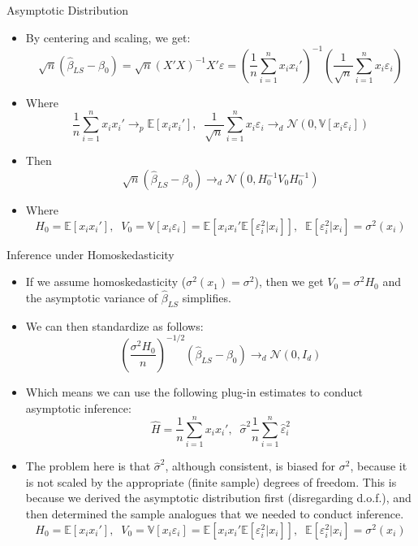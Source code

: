 \documentclass[fleqn, 10pt]{beamer}
\newcommand{\E}{\mathbb{E}}
\newcommand{\V}{\mathbb{V}}
\begin{document}
\begin{frame}{Asymptotic Distribution}
	
	\begin{itemize}
		\item By centering and scaling, we get:
		\[ \sqrt{n} \left( \hat{\beta}_{LS} - \beta_0 \right) = \sqrt{n} (X'X)^{-1}X'\varepsilon =  \left( \frac{1}{n} \sum_{i=1}^{n} x_i x_i' \right)^{-1} \left( \frac{1}{\sqrt{n}} \sum_{i=1}^{n} x_i \varepsilon_i \right) \]
		\item Where
		\[ \frac{1}{n} \sum_{i=1}^{n} x_i x_i' \to_p \E[x_i x_i'], \;\; \frac{1}{\sqrt{n}} \sum_{i=1}^{n} x_i \varepsilon_i \to_d \mathcal{N} (0, \V[x_i\varepsilon_i]) \]
		\item Then
		\[ \sqrt{n} \left( \hat{\beta}_{LS} - \beta_0 \right) \to_d \mathcal{N} (0, H_0^{-1} V_0 H_0^{-1}) \]
		\item Where
		\[ H_0 = \E[x_i x_i'], \;\; V_0 = \V[x_i \varepsilon_i] = \E[x_i x_i' \E[\varepsilon_i^2|x_i]], \;\; \E[\varepsilon_i^2|x_i] = \sigma^2(x_i) \]
	\end{itemize}
	
\end{frame}

\begin{frame}{Inference under Homoskedasticity}
	
	\begin{itemize}
		\item If we assume homoskedasticity (\( \sigma^2(x_1) = \sigma^2 \)), then we get \( V_0 = \sigma^2 H_0 \) and the asymptotic variance of \(\hat{\beta}_{LS} \) simplifies.
		\item We can then standardize as follows:
		\[ \left( \frac{\sigma^2 H_0}{n} \right)^{-1/2} \left( \hat{\beta}_{LS} - \beta_0 \right) \to_d \mathcal{N} (0, I_d) \]
		\item Which means we can use the following plug-in estimates to conduct asymptotic inference:
		\[ \hat{H} = \frac{1}{n} \sum_{i=1}^{n} x_i x_i', \;\; \hat{\sigma}^2 \frac{1}{n} \sum_{i=1}^{n} \hat{\varepsilon}_i^2 \]
		\item The problem here is that \( \hat{\sigma}^2 \), although consistent, is biased for \( \sigma^2 \), because it is not scaled by the appropriate (finite sample) degrees of freedom. This is because we derived the asymptotic distribution first (disregarding d.o.f.), and then determined the sample analogues that we needed to conduct inference.
		\[ H_0 = \E[x_i x_i'], \;\; V_0 = \V[x_i \varepsilon_i] = \E[x_i x_i' \E[\varepsilon_i^2|x_i]], \;\; \E[\varepsilon_i^2|x_i] = \sigma^2(x_i) \]
	\end{itemize}
	
\end{frame}
\end{document}

